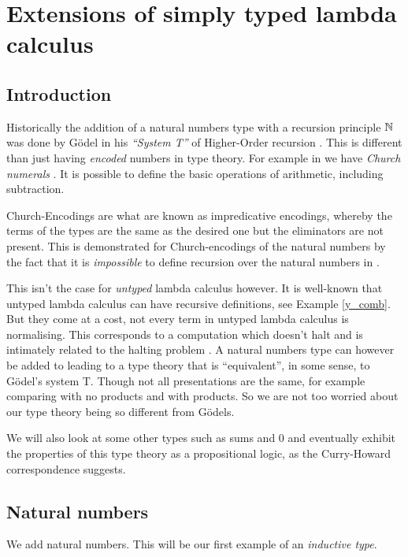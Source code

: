 \section{Extensions of simply typed lambda calculus}

\subsection{Introduction}

Historically the addition of a natural numbers type with a recursion principle $\mathbb{N}$ was done by G\"odel in his \emph{``System T''} of Higher-Order recursion \cite{godel1958}. This is different than just having \emph{encoded} numbers in type theory. For example in \stlc we have \emph{Church numerals} \cite{Leivant:1990:DP:91556.91675, Sorensen}. It is possible to define the basic operations of arithmetic, including subtraction.

Church-Encodings are what are known as impredicative encodings, whereby the terms of the types are the same as the desired one but the eliminators are not present. This is demonstrated for Church-encodings of the natural numbers by the fact that it is \emph{impossible} to define recursion over the natural numbers in \stlc \cite{Sorensen}.

This isn't the case for \emph{untyped} lambda calculus however. It is well-known that untyped lambda calculus can have recursive definitions, see Example \ref{y_comb}. But they come at a cost, not every term in untyped lambda calculus is normalising. This corresponds to a computation which doesn't halt and is intimately related to the halting problem \cite{church1936, church-unsolvableproblemof-1936}. A natural numbers type can however be added to \stlc leading to a type theory that is ``equivalent'', in some sense, to G\"odel's system T. Though not all presentations are the same, for example comparing \cite{harper_2016} with no products and \cite{Sorensen} with products. So we are not too worried about our type theory being so different from G\"odels.

We will also look at some other types such as sums and $0$ and eventually exhibit the properties of this type theory as a propositional logic, as the Curry-Howard correspondence suggests.

\subsection{Natural numbers}

We add natural numbers. This will be our first example of an \emph{inductive type}.

